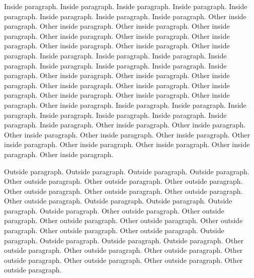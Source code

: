 \documentclass{article}
\begin{document}
\begin{pairs}
\begin{Leftside}
                Inside paragraph. Inside paragraph. Inside paragraph. Inside paragraph. Inside paragraph. Inside paragraph. Inside paragraph. Inside paragraph.
            \pend
            \pstart
                Other inside paragraph.  Other inside paragraph.  Other inside paragraph.  Other inside paragraph.  Other inside paragraph.  Other inside paragraph.  Other inside paragraph.  Other inside paragraph.  Other inside paragraph.  Other inside paragraph.
            \pend
                        \pstart
                Inside paragraph. Inside paragraph. Inside paragraph. Inside paragraph. Inside paragraph. Inside paragraph. Inside paragraph. Inside paragraph.
            \pend
            \pstart
                Other inside paragraph.  Other inside paragraph.  Other inside paragraph.  Other inside paragraph.  Other inside paragraph.  Other inside paragraph.  Other inside paragraph.  Other inside paragraph.  Other inside paragraph.  Other inside paragraph.
            \pend
                        \pstart
                Inside paragraph. Inside paragraph. Inside paragraph. Inside paragraph. Inside paragraph. Inside paragraph. Inside paragraph. Inside paragraph.
            \pend
            \pstart
                Other inside paragraph.  Other inside paragraph.  Other inside paragraph.  Other inside paragraph.  Other inside paragraph.  Other inside paragraph.  Other inside paragraph.  Other inside paragraph.  Other inside paragraph.  Other inside paragraph.
            \pend
        \endnumbering
    \end{Leftside}
    \begin{Rightside}
        \beginnumbering
            \pstart
                Outside paragraph. Outside paragraph. Outside paragraph. Outside paragraph.
            \pend
            \pstart
                Other outside paragraph. Other outside paragraph. Other outside paragraph. Other outside paragraph. Other outside paragraph. Other outside paragraph. Other outside paragraph.
            \pend
                        \pstart
                Outside paragraph. Outside paragraph. Outside paragraph. Outside paragraph.
            \pend
            \pstart
                Other outside paragraph. Other outside paragraph. Other outside paragraph. Other outside paragraph. Other outside paragraph. Other outside paragraph. Other outside paragraph.
            \pend
                        \pstart
                Outside paragraph. Outside paragraph. Outside paragraph. Outside paragraph.
            \pend
            \pstart
                Other outside paragraph. Other outside paragraph. Other outside paragraph. Other outside paragraph. Other outside paragraph. Other outside paragraph. Other outside paragraph.

\end{Rightside}
\end{pairs}
\end{document}
